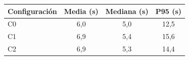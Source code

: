 \begin{tabular}{lccc}
\toprule
Configuración & Media (s) & Mediana (s) & P95 (s) \\
\midrule
C0 & 6{,}0 & 5{,}0 & 12{,}5 \\
C1 & 6{,}9 & 5{,}4 & 15{,}6 \\
C2 & 6{,}9 & 5{,}3 & 14{,}4 \\
\bottomrule
\end{tabular}
